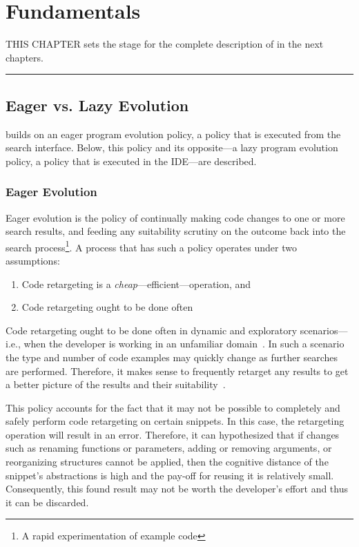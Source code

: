 \chapter{Fundamentals}{}
\label{sec:fundamentals}


\lettrine[lraise=0.1, nindent=0em, slope=-.5em]{T} {HIS CHAPTER} sets the stage for the complete description of \Tool in the next chapters.

\fancybreak{\pfbreakdisplay}

\section{Eager vs. Lazy Evolution}
\label{sec:eagervslazy}

\uppercase{\Tool} builds on an eager program evolution policy, a policy that is executed from the search interface. Below, this policy and its opposite---a lazy program evolution policy, a policy that is executed in the IDE---are described.

\subsection{Eager Evolution}

Eager evolution is the policy of continually making code changes to one or more search results, and feeding any suitability scrutiny on the outcome back into the search process\footnote{A rapid experimentation of example code}. A process that has such a policy operates under two assumptions:

\begin{enumerate}
	\item Code retargeting is a \emph{cheap}---efficient---operation, and
	\item Code retargeting ought to be done often
\end{enumerate}

Code retargeting ought to be done often in dynamic and exploratory scenarios---i.e., when the developer is working in an unfamiliar domain~\cite{Brandt:2009ew}. In such a scenario the type and number of code examples may quickly change as further searches are performed. Therefore, it makes sense to frequently retarget any results to get a better picture of the results and their suitability~\cite{Fowler:1999vp, Brandt:2009ew}. 

This policy accounts for the fact that it may not be possible to completely and safely perform code retargeting on certain snippets. In this case, the retargeting operation will result in an error. Therefore, it can hypothesized that if changes such as renaming functions or parameters, adding or removing arguments, or reorganizing structures cannot be applied, then the cognitive distance of the snippet's abstractions is high and the pay-off for reusing it is relatively small. Consequently, this found result may not be worth the developer's effort and thus it can be discarded.    

